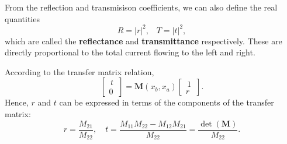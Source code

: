 \documentclass[pra,12pt]{revtex4}
\begin{document}
From the reflection and transmisison coefficients, we can also define
the real quantities
$$R = |r|^2, \;\;\; T = |t|^2,$$
which are called the \textbf{reflectance} and \textbf{transmittance}
respectively.  These are directly proportional to the total current
flowing to the left and right.

According to the transfer matrix relation,
$$\begin{bmatrix}\,t\, \\ 0 \end{bmatrix} = \textbf{M}(x_b,x_a) \begin{bmatrix}\,1\, \\ r
\end{bmatrix}.$$
Hence, $r$ and $t$ can be expressed in terms of the components of the
transfer matrix:
$$r = \frac{M_{21}}{M_{22}}, \quad t = \frac{M_{11} M_{22} - M_{12}M_{21}}{M_{22}} = \frac{\det(\textbf{M})}{M_{22}}.$$
\end{document}
